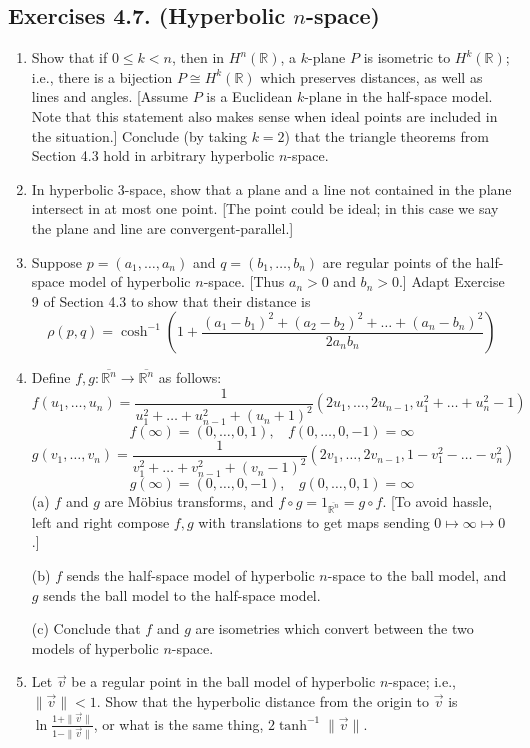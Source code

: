 \documentclass[leqno]{book}
\begin{document}
\subsection*{Exercises 4.7. (Hyperbolic $n$-space)}
\begin{enumerate}
\item Show that if $0\leqslant k<n$, then in $H^n(\mathbb R)$, a $k$-plane $P$ is isometric to $H^k(\mathbb R)$; i.e., there is a bijection $P\cong H^k(\mathbb R)$ which preserves distances, as well as lines and angles.  [Assume $P$ is a Euclidean $k$-plane in the half-space model.  Note that this statement also makes sense when ideal points are included in the situation.]  Conclude (by taking $k=2$) that the triangle theorems from Section 4.3 hold in arbitrary hyperbolic $n$-space.

\item In hyperbolic $3$-space, show that a plane and a line not contained in the plane intersect in at most one point.  [The point could be ideal; in this case we say the plane and line are convergent-parallel.]

\item Suppose $p=(a_1,\dots,a_n)$ and $q=(b_1,\dots,b_n)$ are regular points of the half-space model of hyperbolic $n$-space.  [Thus $a_n>0$ and $b_n>0$.]  Adapt Exercise 9 of Section 4.3 to show that their distance is
$$\rho(p,q)=\cosh^{-1}\left(1+\frac{(a_1-b_1)^2+(a_2-b_2)^2+\dots+(a_n-b_n)^2}{2a_nb_n}\right)$$

\item Define $f,g:\overline{\mathbb R^n}\to\overline{\mathbb R^n}$ as follows:
$$f(u_1,\dots,u_n)=\frac 1{u_1^2+\dots+u_{n-1}^2+(u_n+1)^2}\left(2u_1,\dots,2u_{n-1},u_1^2+\dots+u_n^2-1\right)$$
$$f(\infty)=(0,\dots,0,1),~~~~f(0,\dots,0,-1)=\infty$$
$$g(v_1,\dots,v_n)=\frac 1{v_1^2+\dots+v_{n-1}^2+(v_n-1)^2}\left(2v_1,\dots,2v_{n-1},1-v_1^2-\dots-v_n^2\right)$$
$$g(\infty)=(0,\dots,0,-1),~~~~g(0,\dots,0,1)=\infty$$
(a) $f$ and $g$ are M\"obius transforms, and $f\circ g=1_{\overline{\mathbb R^n}}=g\circ f$.  [To avoid hassle, left and right compose $f,g$ with translations to get maps sending $0\mapsto\infty\mapsto 0$.]

(b) $f$ sends the half-space model of hyperbolic $n$-space to the ball model, and $g$ sends the ball model to the half-space model.

(c) Conclude that $f$ and $g$ are isometries which convert between the two models of hyperbolic $n$-space.

\item Let $\vec v$ be a regular point in the ball model of hyperbolic $n$-space; i.e., $\|\vec v\|<1$.  Show that the hyperbolic distance from the origin to $\vec v$ is $\ln\frac{1+\|\vec v\|}{1-\|\vec v\|}$, or what is the same thing, $2\tanh^{-1}\|\vec v\|$.


\end{enumerate}
\end{document}
